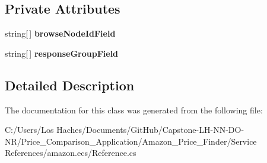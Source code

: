 \subsection*{Private Attributes}
\begin{DoxyCompactItemize}
\item 
\hypertarget{class_price___comparison_1_1amazon_1_1ecs_1_1_browse_node_lookup_request_a696ced2a7cb7d9698f937f8e26f4bbdc}{string\mbox{[}$\,$\mbox{]} {\bfseries browse\-Node\-Id\-Field}}\label{class_price___comparison_1_1amazon_1_1ecs_1_1_browse_node_lookup_request_a696ced2a7cb7d9698f937f8e26f4bbdc}

\item 
\hypertarget{class_price___comparison_1_1amazon_1_1ecs_1_1_browse_node_lookup_request_a935c182d3540625e46805caa2d1a5451}{string\mbox{[}$\,$\mbox{]} {\bfseries response\-Group\-Field}}\label{class_price___comparison_1_1amazon_1_1ecs_1_1_browse_node_lookup_request_a935c182d3540625e46805caa2d1a5451}

\end{DoxyCompactItemize}


\subsection{Detailed Description}


The documentation for this class was generated from the following file\-:\begin{DoxyCompactItemize}
\item 
C\-:/\-Users/\-Los Haches/\-Documents/\-Git\-Hub/\-Capstone-\/\-L\-H-\/\-N\-N-\/\-D\-O-\/\-N\-R/\-Price\-\_\-\-Comparison\-\_\-\-Application/\-Amazon\-\_\-\-Price\-\_\-\-Finder/\-Service References/amazon.\-ecs/Reference.\-cs\end{DoxyCompactItemize}
